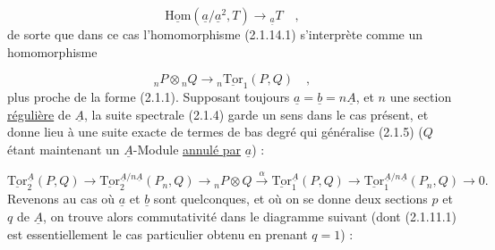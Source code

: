 
\begin{equation*}
 \underline{\mathrm{Hom}}(\underline{a}/\underline{a}^2 , T) \longrightarrow {}_{\underline{a}}T \quad ,
\end{equation*}
de sorte que dans ce cas l'homomorphisme (2.1.14.1) s'interprète comme un homomorphisme

\begin{equation}\tag{2.1.14.4}
{}_nP \otimes {}_nQ \longrightarrow {}_n\underline{\mathrm{Tor}}_1(P,Q) \quad ,
\end{equation}
plus proche de la forme (2.1.1). Supposant toujours $\underline{a} = \underline{b} = n\underline{A}$, et $n$ une section \underline{régulière} de $\underline{A}$, la suite spectrale (2.1.4) garde un sens dans le cas présent, et donne lieu à une suite exacte de termes de bas degré qui généralise (2.1.5) ($Q$ étant maintenant un $\underline{A}$-Module \underline{annulé par} $\underline{a}$) :

\begin{equation}\tag{2.1.14.5}
\underline{\mathrm{Tor}}_2^{\underline{A}}(P,Q) \longrightarrow \underline{\mathrm{Tor}}_2^{\underline{A}/n\underline{A}}(P_n,Q) \longrightarrow {}_nP \otimes Q \xrightarrow{\ \alpha\ } \underline{\mathrm{Tor}}_1^{\underline{A}}(P,Q) \longrightarrow \underline{\mathrm{Tor}}_1^{\underline{A}/n\underline{A}}(P_n,Q) \longrightarrow 0.
\end{equation}
Revenons au cas où $\underline{a}$ et $\underline{b}$ sont quelconques, et où on se donne deux sections $p$ et $q$ de $\underline{A}$, on trouve alors commutativité dans le diagramme suivant (dont (2.1.11.1) est essentiellement le cas particulier obtenu en prenant $q=1$) :

